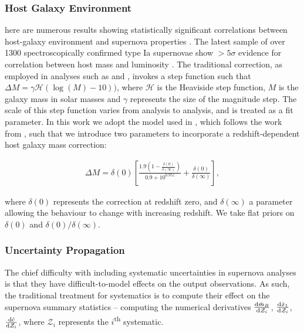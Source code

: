 \documentclass[a4paper,fleqn,usenatbib]{emulateapj}
\newcommand{\Z}{\mathcal{Z}}
\newcommand{\rubin}{\citetalias{Rubin2015}}
\begin{document}
\subsubsection{Host Galaxy Environment}
\label{sec:hostgal}

here are numerous results showing statistically significant correlations between host-galaxy environment and supernova properties \citep{Kelly2010, Lampeitl2010, Sullivan2010, DAndrea2011, Gupta2011, Johansson2013, Rigault2013}. The latest sample of over 1300 spectroscopically confirmed type Ia supernovae show $>5\sigma$ evidence for correlation between host mass and luminosity \citep{Uddin2017}. The traditional correction, as employed in analyses such as \citet{Suzuki2012} and \citet{Betoule2014}, invokes a step function such that $\Delta M = \gamma \mathcal{H}(\log(M) - 10))$, where $\mathcal{H}$ is the Heaviside step function, $M$ is the galaxy mass in solar masses and $\gamma$ represents the size of the magnitude step. The scale of this step function varies from analysis to analysis, and is treated as a fit parameter. In this work we adopt the model used in {\rubin}, which follows the work from \citet{Rigault2013}, such that we introduce two parameters to incorporate a redshift-dependent host galaxy mass correction:


\begin{align}
\Delta M = \delta(0) \left[ \frac{1.9\left(1 - \frac{\delta(0)}{\delta(\infty)}\right)  }{0.9 + 10^{0.95z}} + \frac{\delta(0)}{\delta(\infty)}\right], \label{eq:mass}
\end{align}

where $\delta(0)$ represents the correction at redshift zero, and $\delta(\infty)$ a parameter allowing the behaviour to change with increasing redshift. We take flat priors on $\delta(0)$ and $\delta(0)/\delta(\infty)$.



\subsubsection{Uncertainty Propagation}
\label{sec:systreat}
The chief difficulty with including systematic uncertainties in supernova analyses is that they have difficult-to-model effects on the output observations. As such, the traditional treatment for systematics is to compute their effect on the supernova summary statistics -- computing the numerical derivatives $\frac{{\rm d} \hat{m}_B}{{\rm d} \Z_i}$, $\frac{{\rm d} \hat{x}_1}{{\rm d} \Z_i}$, $\frac{{\rm d} \hat{c}}{{\rm d} \Z_i}$, where $\Z_i$ represents the $i$\textsuperscript{th} systematic.
\end{document}
